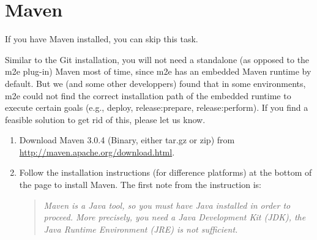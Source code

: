 
\section{Maven}

If you have Maven installed, you can skip this task.

Similar to the Git installation, you will not need a standalone (as opposed to the m2e plug-in) Maven most of time, since m2e has an embedded Maven runtime by default. But we (and some other developpers) found that in some environments, m2e could not find the correct installation path of the embedded runtime to execute certain goals (e.g., deploy, release:prepare, release:perform). If you find a feasible solution to get rid of this, please let us know.

\begin{enumerate}
\item Download Maven 3.0.4 (Binary, either tar.gz or zip) from \url{http://maven.apache.org/download.html}.
\item Follow the installation instructions (for difference platforms) at the bottom of the page to install Maven. The first note from the instruction is:

\begin{quote}
\emph{Maven is a Java tool, so you must have Java installed in order to proceed. More precisely, you need a Java Development Kit (JDK), the Java Runtime Environment (JRE) is not sufficient.}
\end{quote}
\end{enumerate}